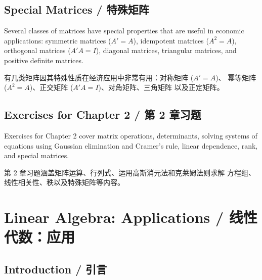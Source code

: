\section{Special Matrices / 特殊矩阵}

\begin{original}
Several classes of matrices have special properties that are useful in
economic applications: symmetric matrices ($A' = A$), idempotent
matrices ($A^2 = A$), orthogonal matrices ($A'A = I$), diagonal
matrices, triangular matrices, and positive definite matrices.
\end{original}
\begin{translation}
有几类矩阵因其特殊性质在经济应用中非常有用：对称矩阵 ($A' = A$)、
幂等矩阵 ($A^2 = A$)、正交矩阵 ($A'A = I$)、对角矩阵、三角矩阵
以及正定矩阵。
\end{translation}

\section*{Exercises for Chapter 2 / 第 2 章习题}

\begin{original}
Exercises for Chapter 2 cover matrix operations, determinants, solving
systems of equations using Gaussian elimination and Cramer's rule,
linear dependence, rank, and special matrices.
\end{original}
\begin{translation}
第 2 章习题涵盖矩阵运算、行列式、运用高斯消元法和克莱姆法则求解
方程组、线性相关性、秩以及特殊矩阵等内容。
\end{translation}


\chapter{Linear Algebra: Applications / 线性代数：应用}

\section{Introduction / 引言}

